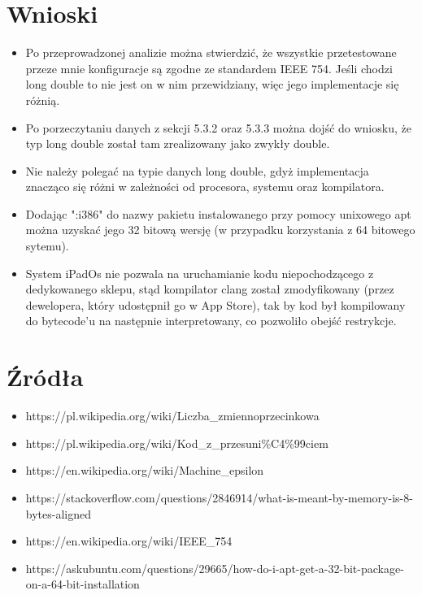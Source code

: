 \documentclass{article}
\begin{document}
\section{Wnioski}

\begin{itemize}

\item Po przeprowadzonej analizie można stwierdzić, że wszystkie przetestowane przeze mnie konfiguracje są zgodne ze standardem IEEE 754. Jeśli chodzi long double to nie jest on w nim przewidziany, więc jego implementacje się różnią.
\item Po porzeczytaniu danych z sekcji 5.3.2 oraz 5.3.3 można dojść do wniosku, że typ long double został tam zrealizowany jako zwykły double.
\item Nie należy polegać na typie danych long double, gdyż implementacja znacząco się różni w zależności od procesora, systemu oraz kompilatora.
\item Dodając ":i386" do nazwy pakietu instalowanego przy pomocy unixowego apt można uzyskać jego 32 bitową wersję (w przypadku korzystania z 64 bitowego sytemu).
\item System iPadOs nie pozwala na uruchamianie kodu niepochodzącego z dedykowanego sklepu, stąd kompilator clang został zmodyfikowany (przez dewelopera, który udostępnił go w App Store), tak by kod był kompilowany do bytecode'u na następnie interpretowany, co pozwoliło obejść restrykcje.

\end{itemize}


\section{Źródła}

\begin{itemize}
\item https://pl.wikipedia.org/wiki/Liczba\_zmiennoprzecinkowa
\item https://pl.wikipedia.org/wiki/Kod\_z\_przesuni\%C4\%99ciem
\item https://en.wikipedia.org/wiki/Machine\_epsilon
\item https://stackoverflow.com/questions/2846914/what-is-meant-by-memory-is-8-bytes-aligned
\item https://en.wikipedia.org/wiki/IEEE\_754
\item https://askubuntu.com/questions/29665/how-do-i-apt-get-a-32-bit-package-on-a-64-bit-installation
\end{itemize}
\end{document}
